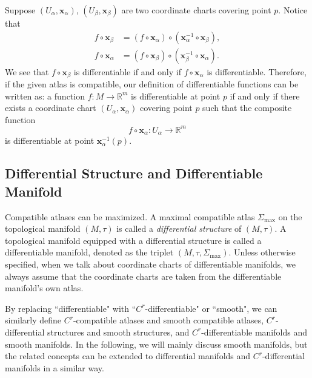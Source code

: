 \documentclass{report}
\begin{document}
Suppose $(U_\alpha,\mathbf{x}_\alpha)$, $(U_\beta,\mathbf{x}_\beta)$ are two coordinate charts covering point $p$. Notice that
$$
\begin{aligned}
f\circ \mathbf{x}_\beta &= (f\circ \mathbf{x}_\alpha)\circ(\mathbf{x}^{-1}_\alpha\circ \mathbf{x}_{\beta}),\\
f\circ \mathbf{x}_\alpha &= (f\circ \mathbf{x}_\beta)\circ(\mathbf{x}^{-1}_\beta\circ \mathbf{x}_{\alpha}).
\end{aligned}
$$
We see that $f \circ \mathbf{x}_\beta$ is differentiable if and only if $f \circ \mathbf{x}_\alpha$ is differentiable. Therefore, if the given atlas is compatible, our definition of differentiable functions can be written as: a function $f: M \to \mathbb{R}^m$ is differentiable at point $p$ if and only if there exists a coordinate chart $(U_\alpha, \mathbf{x}_\alpha)$ covering point $p$ such that the composite function
$$
f\circ \mathbf{x}_\alpha:U_\alpha\longrightarrow \mathbb{R}^m
$$
is differentiable at point $\mathbf{x}^{-1}_\alpha(p)$.

\subsection{Differential Structure and Differentiable Manifold}
Compatible atlases can be maximized.
A maximal compatible atlas $\Sigma_{\max}$ on the topological manifold $(M, \tau)$ is called a \emph{differential structure} of $(M, \tau)$. A topological manifold equipped with a differential structure is called a differentiable manifold, denoted as the triplet $(M, \tau, \Sigma_{\max})$. Unless otherwise specified, when we talk about coordinate charts of differentiable manifolds, we always assume that the coordinate charts are taken from the differentiable manifold's own atlas.

By replacing ``differentiable" with ``$C^r$-differentiable" or ``smooth", we can similarly define $C^r$-compatible atlases and smooth compatible atlases, $C^r$-differential structures and smooth structures, and $C^r$-differentiable manifolds and smooth manifolds. In the following, we will mainly discuss smooth manifolds, but the related concepts can be extended to differential manifolds and $C^r$-differential manifolds in a similar way.
\end{document}
